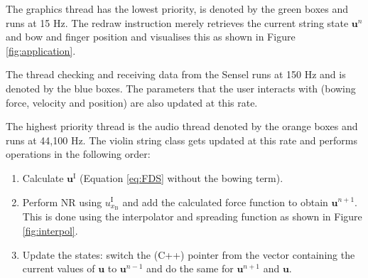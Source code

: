 \documentclass[twoside,a4paper,dvipsnames]{article}
\begin{document}
The graphics thread has the lowest priority, is denoted by the green boxes and runs at 15 Hz. The redraw instruction merely retrieves the current string state $\mathbf{u}^n$ and bow and finger position and visualises this as shown in Figure \ref{fig:application}.

The thread checking and receiving data from the Sensel runs at 150 Hz and is denoted by the blue boxes. The parameters that the user interacts with (bowing force, velocity and position) are also updated at this rate.

The highest priority thread is the audio thread denoted by the orange boxes and runs at 44,100 Hz. The violin string class gets updated at this rate and performs operations in the following order:
\begin{enumerate}
    \item Calculate $\mathbf{u}^\text{I}$ (Equation \eqref{eq:FDS} without the bowing term). 
    \item Perform NR using $u^\text{I}_{x_\text{B}}$ and add the calculated force function to obtain $\mathbf{u}^{n+1}$. This is done using the interpolator and spreading function as shown in Figure \ref{fig:interpol}.
    \item Update the states: switch the (C++) pointer from the vector containing the current values of $\mathbf{u}$ to $\mathbf{u}^{n-1}$ and do the same for $\mathbf{u}^{n+1}$ and $\mathbf{u}$. 
\end{enumerate}
\end{document}
